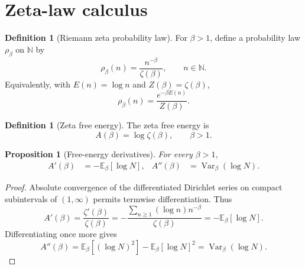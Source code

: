 \documentclass[11pt]{article}
\numberwithin{equation}{section}
\newtheorem{proposition}[theorem]{Proposition}
\theoremstyle{definition}
\newtheorem{definition}[theorem]{Definition}
\theoremstyle{remark}
\DeclareMathOperator{\Var}{Var}
\newcommand{\E}{\mathbb E}
\newcommand{\N}{\mathbb N}
\newcommand{\1}{\mathbf 1}
\begin{document}
\section{Zeta-law calculus}

\begin{definition}[Riemann zeta probability law]
\label{def:zeta-law}
For \(\beta>1\), define a probability law \(\rho_\beta\) on \(\N\) by
\begin{equation}
\label{eq:zeta-law}
\rho_\beta(n)=\frac{n^{-\beta}}{\zeta(\beta)},\qquad n\in\N.
\end{equation}
Equivalently, with \(E(n)=\log n\) and \(Z(\beta)=\zeta(\beta)\),
\begin{equation}
\label{eq:gibbs-form}
\rho_\beta(n)=\frac{e^{-\beta E(n)}}{Z(\beta)}.
\end{equation}
\end{definition}

\begin{definition}[Zeta free energy]
\label{def:zeta-free-energy}
The zeta free energy is
\begin{equation}
\label{eq:zeta-free-energy}
A(\beta)=\log\zeta(\beta),\qquad \beta>1.
\end{equation}
\end{definition}

\begin{proposition}[Free-energy derivatives]
\label{prop:free-energy-derivatives}
For every \(\beta>1\),
\begin{align}
\label{eq:free-energy-derivatives}
A'(\beta)&=-\E_\beta[\log N],&
A''(\beta)&=\Var_\beta(\log N).
\end{align}
\end{proposition}

\begin{proof}
Absolute convergence of the differentiated Dirichlet series on compact subintervals of \((1,\infty)\) permits termwise differentiation.  Thus
\begin{equation}
\label{eq:first-free-derivative-proof}
A'(\beta)=\frac{\zeta'(\beta)}{\zeta(\beta)}
=-\frac{\sum_{n\ge1}(\log n)n^{-\beta}}{\zeta(\beta)}
=-\E_\beta[\log N].
\end{equation}
Differentiating once more gives
\begin{equation}
\label{eq:second-free-derivative-proof}
A''(\beta)=\E_\beta[(\log N)^2]-\E_\beta[\log N]^2
=\Var_\beta(\log N).
\end{equation}
\end{proof}
\end{document}
